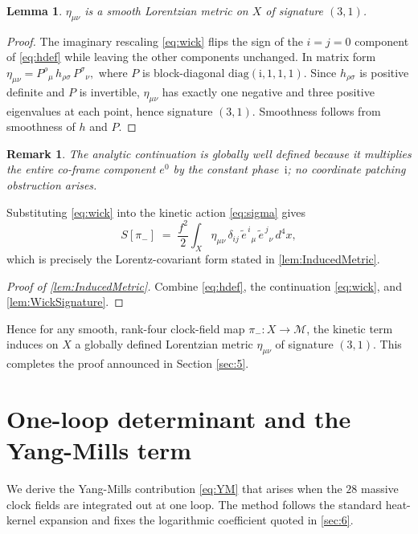 \documentclass[pdflatex,sn-mathphys-num]{sn-jnl}
\theoremstyle{thmstyleone}
\newtheorem{lemma}[lemma]{Lemma}
\theoremstyle{thmstyletwo}%
\newtheorem{remark}{Remark}%
\theoremstyle{thmstylethree}%
\begin{document}
\begin{appendices}
\begin{lemma}\label{lem:WickSignature}
$\eta_{\mu\nu}$ is a smooth Lorentzian metric on \(X\) of signature
\((3,1)\).
\end{lemma}

\begin{proof}
The imaginary rescaling \eqref{eq:wick} flips the sign of the
\(i=j=0\) component of \eqref{eq:hdef} while leaving the other
components unchanged.  In matrix form
\(
  \eta_{\mu\nu}=P^{\rho}{}_{\mu}\,h_{\rho\sigma}\,P^{\sigma}{}_{\nu},
\)
where \(P\) is block-diagonal
\(\mathrm{diag}(\mathrm{i},1,1,1)\).
Since \(h_{\rho\sigma}\) is positive definite and \(P\) is invertible,
\(\eta_{\mu\nu}\) has exactly one negative and three positive
eigenvalues at each point, hence signature \((3,1)\).
Smoothness follows from smoothness of \(h\) and \(P\).
\end{proof}

\begin{remark}
The analytic continuation is globally well defined because it multiplies
the entire co-frame component \(e^{0}\) by the constant phase~$\mathrm{i}$;
no coordinate patching obstruction arises.
\end{remark}

Substituting \eqref{eq:wick} into the kinetic action
\eqref{eq:sigma} gives
\[
  S[\pi_-]
  \;=\;
  \frac{f^{2}}2
  \int_{X}
     \eta_{\mu\nu}\,
     \delta_{ij}\,
     \tilde e^{\,i}{}_{\mu}\,
     \tilde e^{\,j}{}_{\nu}\,d^{4}x,
\]
which is precisely the Lorentz-covariant form stated in \autoref{lem:InducedMetric}.

\begin{proof}[Proof of \autoref{lem:InducedMetric}]
Combine \eqref{eq:hdef}, the continuation \eqref{eq:wick},
and \autoref{lem:WickSignature}.
\end{proof}

\bigskip
Hence for any smooth, rank-four clock-field map
\(\pi_-:X\to\mathcal M\), the kinetic term induces on \(X\) a globally
defined Lorentzian metric \(\eta_{\mu\nu}\) of signature \((3,1)\).
This completes the proof announced in Section \ref{sec:5}.

\section{One-loop determinant and the Yang-Mills term}
\label{app:YMloop}
We derive the Yang-Mills contribution \eqref{eq:YM} that arises when the
$28$ massive clock fields are integrated out at one loop.  The method
follows the standard heat-kernel expansion
\cite{Vassilevich:2003,Hawking:1977} and fixes the logarithmic
coefficient quoted in \autoref{sec:6}.


\end{appendices}
\end{document}

